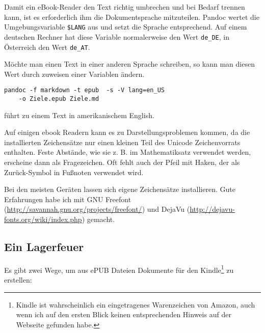 \documentclass[11pt,ngerman,a4paper]{article}
\begin{document}
Damit ein eBook-Reader den Text richtig umbrechen und bei Bedarf trennen
kann, ist es erforderlich ihm die Dokumentsprache mitzuteilen. Pandoc
wertet die Umgebungsvariable \texttt{\$LANG} aus und setzt die Sprache
entsprechend. Auf einem deutschen Rechner hat diese Variable
normalerweise den Wert \texttt{de\_DE}, in Österreich den Wert
\texttt{de\_AT}.

Möchte man einen Text in einer anderen Sprache schreiben, so kann man
diesen Wert durch zuweisen einer Variablen ändern.

\begin{verbatim}
pandoc -f markdown -t epub  -s -V lang=en_US
    -o Ziele.epub Ziele.md
\end{verbatim}

führt zu einem Text in amerikanischem English.

Auf einigen ebook Readern kann es zu Darstellungsproblemen kommen, da
die installierten Zeichensätze nur einen kleinen Teil des Unicode
Zeichenvorrats enthalten. Feste Abstände, wie sie z. B. im
Mathematiksatz verwendet werden, erscheine dann als Fragezeichen. Oft
fehlt auch der Pfeil mit Haken, der als Zurück-Symbol in Fußnoten
verwendet wird.

Bei den meisten Geräten lassen sich eigene Zeichensätze installieren.
Gute Erfahrungen habe ich mit GNU Freefont
(\url{http://savannah.gnu.org/projects/freefont/}) und DejaVu
(\url{http://dejavu-fonts.org/wiki/index.php}) gemacht.

\subsection{Ein Lagerfeuer}\label{ein-lagerfeuer}

Es gibt zwei Wege, um aus ePUB Dateien Dokumente für den
Kindle\footnote{Kindle ist wahrscheinlich ein eingetragenes Warenzeichen
  von Amazon, auch wenn ich auf den ersten Blick keinen entsprechenden
  Hinweis auf der Webseite gefunden habe.} zu erstellen:
\end{document}
